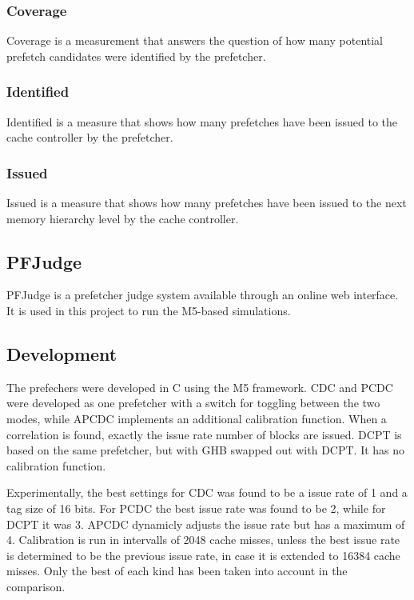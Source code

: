 \documentclass[a4paper]{IEEEtran}
\begin{document}
\subsubsection{Coverage}
Coverage is a measurement that answers the question of how many potential prefetch candidates were identified by the prefetcher.

\subsubsection{Identified}
Identified is a measure that shows how many prefetches have been issued to the cache controller by the prefetcher.

\subsubsection{Issued}
Issued is a measure that shows how many prefetches have been issued to the next memory hierarchy level by the cache controller.

\subsection{PFJudge}

PFJudge is a prefetcher judge system available through an online web interface.
It is used in this project to run the M5-based simulations.

\subsection{Development}

The prefechers were developed in C using the M5 framework.
CDC and PCDC were developed as one prefetcher with a switch for toggling between the two modes, while APCDC implements an additional calibration function.
When a correlation is found, exactly the issue rate number of blocks are issued.
DCPT is based on the same prefetcher, but with GHB swapped out with DCPT.
It has no calibration function.

Experimentally, the best settings for CDC was found to be a issue rate of 1 and a tag size of 16 bits.
For PCDC the best issue rate was found to be 2, while for DCPT it was 3.
APCDC dynamicly adjusts the issue rate but has a maximum of 4.
Calibration is run in intervalls of 2048 cache misses, unless the best issue rate is determined to be the previous issue rate, in case it is extended to 16384 cache misses.
Only the best of each kind has been taken into account in the comparison.
\end{document}
